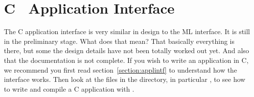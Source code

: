 \section{C \ensemble\ Application Interface}

The C application interface is very similar in design to the ML interface.  It is
still in the preliminary stage.  What does that mean?  That basically everything is
there, but some the design details have not been totally worked out yet.  And also
that the documentation is not complete.  If you wish to write an application in C, we
recommend you first read section~\ref{section:applintf} to understand how the
interface works.  Then look at the files in the \sourcecappl{} directory, in
particular , to see how to write and compile a C application
with \ensemble.

